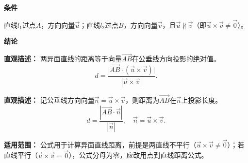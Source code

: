 \begin{statementbox}
	\textbf{\textcolor{CStatement}{条件}}
	\begin{description}[style=nextline, leftmargin=2.8em, labelsep=0.5em, itemsep=0.35em]
		\item[\textbf{\textcolor{CStatement}{条件1（方向不平行）：}}] 直线$l_1$过点$A$，方向向量$\vec{u}$；直线$l_2$过点$B$，方向向量$\vec{v}$，且$\vec{u}\nparallel\vec{v}$（即$\vec{u}\times\vec{v}\neq\vec{0}$）。
	\end{description}

	\textbf{\textcolor{CStatement}{结论}}
	\begin{description}[style=nextline, leftmargin=2.8em, labelsep=0.5em, itemsep=0.45em]
		\item[\textbf{\textcolor{CStatement}{结论一（异面距离公式）：}}]
			\textbf{\textcolor{CStatement}{直观描述：}}
			两异面直线的距离等于向量$\overrightarrow{AB}$在公垂线方向投影的绝对值。
			\[
				d = \frac{\bigl| \overrightarrow{AB} \cdot (\vec{u} \times \vec{v}) \bigr|}{|\vec{u} \times \vec{v}|}.
			\]

		\item[\textbf{\textcolor{CStatement}{推广结论（法向量表示）：}}]
			\textbf{\textcolor{CStatement}{直观描述：}}
			记公垂线方向向量$\vec{n} = \vec{u}\times\vec{v}$，则距离为$\overrightarrow{AB}$在$\vec{n}$上投影长度。
			\[
				d = \frac{|\overrightarrow{AB} \cdot \vec{n}|}{|\vec{n}|}, \quad \vec{n} = \vec{u}\times\vec{v}.
			\]
	\end{description}

	\medskip
	\textbf{\textcolor{CStatement}{适用范围：}}
	公式用于计算异面直线距离，前提是两直线不平行（$\vec{u}\times\vec{v}\neq\vec{0}$）；若直线平行（$\vec{u}\times\vec{v}=\vec{0}$），公式分母为零，应改用点到直线距离公式。
\end{statementbox}
